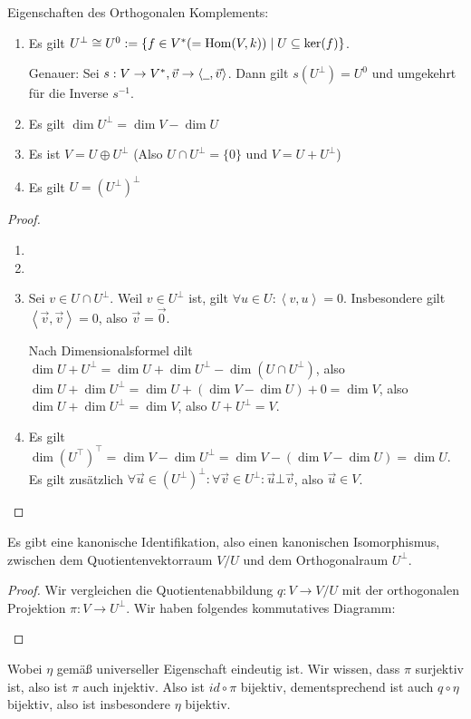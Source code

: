\documentclass{report}
\newcommand*{\newpar}{\par\vspace{\baselineskip}\noindent}
\renewcommand{\vu}{\vec{u}}
\newcommand{\vv}{\vec{v}}
\newcommand{\vz}{\vec{0}}
\newcommand{\scalar}[2]{\left\langle #1, #2 \right\rangle}
\begin{document}
\begin{theorem}
 Eigenschaften des Orthogonalen Komplements:
 \begin{enumerate}
  \item Es gilt $U^\bot \cong U^0 := \{f \in V^* (= \textnormal{Hom}(V,k)) \mid U \subseteq \ker(f)\}$.
  
  Genauer: Sei $s : V \to V^*, \vv \to \scalar{\underline{\hphantom{v}}}{\vv}$. Dann gilt $s(U^\bot) = U^0$ und umgekehrt für die Inverse $s^{-1}$.
  \item Es gilt $\dim U^\bot = \dim V - \dim U$
  \item Es ist $V = U \oplus U^\bot$ (Also $U \cap U^\bot = \{0\}$ und $V = U + U^\bot$)
  \item Es gilt $U = (U^\bot)^\bot$
 \end{enumerate}
\end{theorem}
\begin{proof}
 \hphantom{v}
 \begin{enumerate}
  \item
  \item
  \item Sei $v \in U \cap U^\bot$. Weil $v \in U^\bot$ ist, gilt $\forall u \in U : \scalar{v}{u} = 0$. Insbesondere gilt $\scalar{\vv}{\vv} = 0$, also $\vv = \vz$.
 \newpar
 Nach Dimensionalsformel dilt $\dim U + U^\bot = \dim U + \dim U^\bot - \dim (U \cap U^\bot)$, also $\dim U + \dim U^\bot = \dim U + (\dim V - \dim U) + 0 = \dim V$, also $\dim U + \dim U^\bot = \dim V$, also $U + U^\bot = V$.
   \item Es gilt $\dim (U^\top)^\top = \dim V - \dim U^\bot = \dim V - (\dim V - \dim U) = \dim U$. Es gilt zusätzlich $\forall \vu \in (U^\bot)^\bot : \forall \vv \in U^\bot :\vu \bot \vv$, also $\vu \in V$.
 \end{enumerate} 
\end{proof}
\begin{theorem}
 Es gibt eine kanonische Identifikation, also einen kanonischen Isomorphismus, zwischen dem Quotientenvektorraum $V / U$ und dem Orthogonalraum $U^\bot$.
\end{theorem}
\begin{proof}
 Wir vergleichen die Quotientenabbildung $q : V \to V / U$ mit der orthogonalen Projektion $\pi : V \to U^\bot$. Wir haben folgendes kommutatives Diagramm:
 \begin{center}
\end{center}
\end{proof}
\hspace{-20pt}
Wobei $\eta$ gemäß universeller Eigenschaft eindeutig ist. Wir wissen, dass $\pi$ surjektiv ist, also ist $\pi$ auch injektiv. Also ist $id \circ \pi$ bijektiv, dementsprechend ist auch $q \circ \eta$ bijektiv, also ist insbesondere $\eta$ bijektiv.
%
%
%
%
%
%
%
%
%
\end{document}
